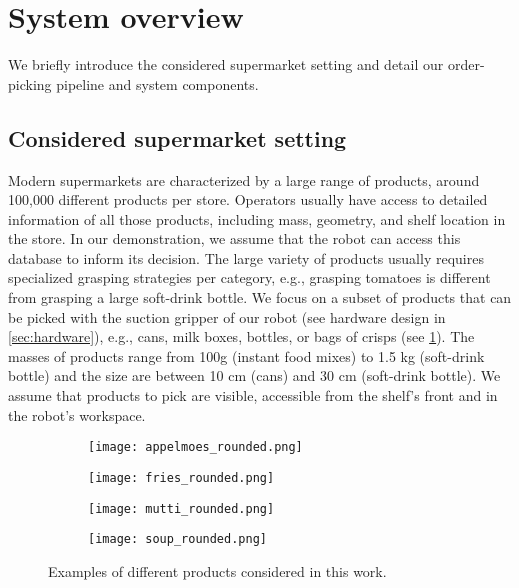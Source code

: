 \section{System overview}

We briefly introduce the considered supermarket setting and detail our order-picking pipeline and system components.

\subsection{Considered supermarket setting}

Modern supermarkets are characterized by a large range of
products, around 100,000 different products per store.
Operators usually have access to detailed information of all
those products, including mass, geometry, and shelf location
in the store. In our demonstration, we assume that the robot
can access this database to inform its decision. The large
variety of products usually requires specialized grasping
strategies per category, e.g., grasping tomatoes is
different from grasping a large soft-drink bottle. We focus
on a subset of products that can be picked with the suction
gripper of our robot (see hardware design in
\cref{sec:hardware}), e.g., cans, milk boxes, bottles, or
bags of crisps (see \cref{fig:product_examples}). The masses
of products range from 100g (instant food mixes) to 1.5 kg
(soft-drink bottle) and the size are between 10 cm (cans)
and 30 cm (soft-drink bottle). We assume that products to
pick are visible, accessible from the shelf's front and in the robot's workspace.
\begin{figure}[t]
  \centering
  \begin{subfigure}[b]{0.24\linewidth}
    \centering
    \texttt{[image: appelmoes\_rounded.png]}
  \end{subfigure}%
  \begin{subfigure}[b]{0.24\linewidth}
    \centering
    \texttt{[image: fries\_rounded.png]}
  \end{subfigure}%
  \begin{subfigure}[b]{0.24\linewidth}
    \centering
    \texttt{[image: mutti\_rounded.png]}
  \end{subfigure}%
  \begin{subfigure}[b]{0.24\linewidth}
    \centering
    \texttt{[image: soup\_rounded.png]}
  \end{subfigure}%
  \caption{Examples of different products considered in this
  work.}
  \label{fig:product_examples}
\end{figure}

